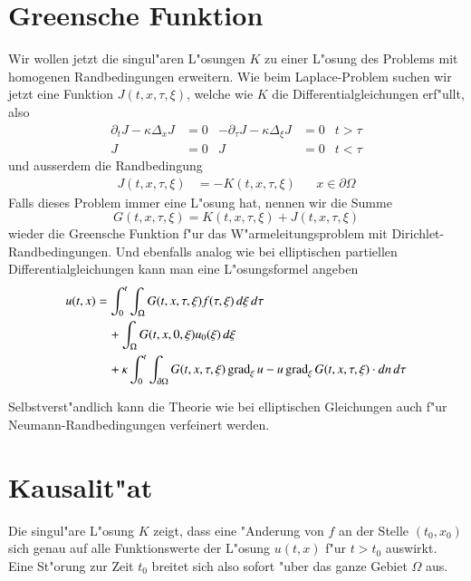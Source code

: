 \section{Greensche Funktion}
Wir wollen jetzt die singul"aren L"osungen $K$ zu einer L"osung des Problems
mit homogenen Randbedingungen erweitern.
Wie beim Laplace-Problem suchen wir jetzt eine Funktion $J(t,x,\tau,\xi)$,
welche wie $K$ die Differentialgleichungen erf"ullt, also
\begin{align*}
\partial_t J-\kappa\Delta_xJ&=0
&
-\partial_\tau J-\kappa\Delta_\xi J&=0
&t>\tau
\\
J&=0&J&=0&t<\tau
\end{align*}
und ausserdem die Randbedingung 
\begin{align*}
J(t,x,\tau,\xi)&=-K(t,x,\tau,\xi)&&x\in\partial\Omega
\end{align*}
Falls dieses Problem immer eine L"osung hat, nennen wir die
Summe
\[
G(t,x,\tau,\xi)=K(t,x,\tau,\xi)+J(t,x,\tau,\xi)
\]
wieder die Greensche Funktion f"ur das W"armeleitungsproblem
mit Dirichlet-Rand\-bedingungen. Und ebenfalls analog wie bei elliptischen
partiellen Differentialgleichungen kann man eine L"osungsformel
angeben
\begin{align}
u(t,x)&=
\int_0^t\int_{\Omega}G(t,x,\tau,\xi)f(\tau,\xi)\,d\xi\,d\tau
\notag
\\
&\quad+\int_{\Omega}G(t,x,0,\xi)u_0(\xi)\,d\xi
\notag
\\
&\quad +\kappa\int_0^t\int_{\partial \Omega}
G(t,x,\tau,\xi)\operatorname{grad}_\xi u
-u\operatorname{grad}_\xi G(t,x,\tau,\xi)\cdot dn\,d\tau
\label{green-parabolisch}
\end{align}

Selbstverst"andlich kann die Theorie wie bei elliptischen Gleichungen
auch f"ur Neumann-Randbedingungen verfeinert werden.

\section{Kausalit"at}
Die singul"are L"osung $K$ zeigt, dass eine "Anderung von $f$ an der Stelle
$(t_0,x_0)$ sich genau auf alle Funktionswerte der L"osung $u(t,x)$ f"ur
$t>t_0$ auswirkt. Eine St"orung zur Zeit $t_0$ breitet sich also sofort
"uber das ganze Gebiet $\Omega$ aus.

